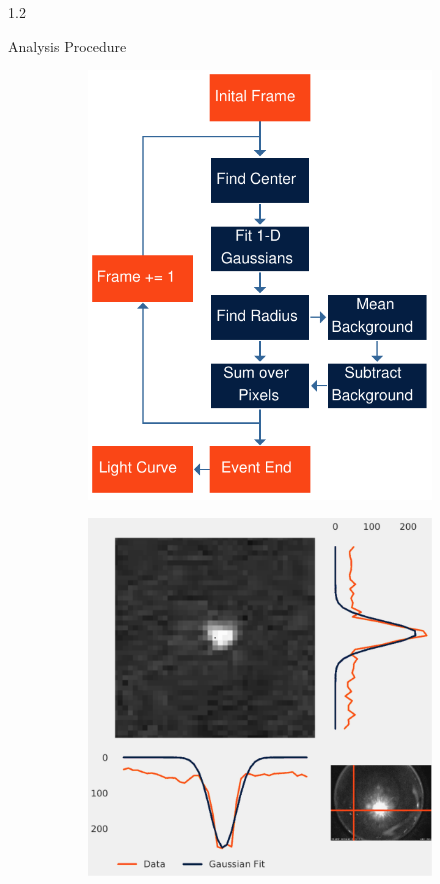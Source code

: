 \documentclass[final]{beamer}
\newlength{\twocolwid}
\begin{document}
\begin{frame}[t]
\begin{columns}[t]
\begin{column}{1.2\twocolwid}
\begin{alertblock}{Analysis Procedure}
\begin{figure}
\centering
\begin{subfigure}{.5\textwidth}
  \centering
  \includegraphics[width=\linewidth]{flowchartastro.pdf}
  \label{fig:flowchart}
\end{subfigure}%
\begin{subfigure}{.5\textwidth}
  \centering
  \includegraphics[width=\linewidth]{testplot3.pdf}

\end{subfigure}
\end{figure}
\end{alertblock}
\end{column}
\end{columns}
\end{frame}
\end{document}
